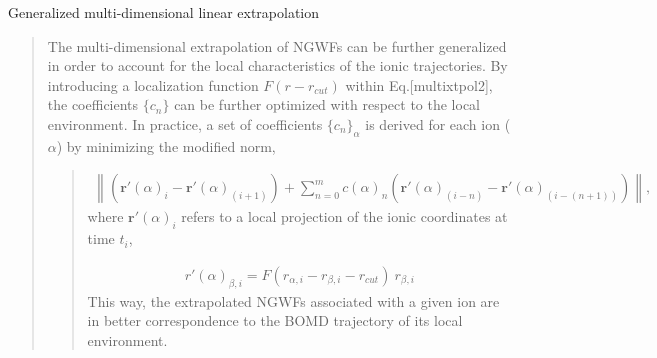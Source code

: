 \documentclass[letterpaper,10pt,english]{sphinxmanual}
\begin{document}
Generalized multi-dimensional linear extrapolation
\begin{quote}

\begin{DUlineblock}{0em}
\item[] The multi-dimensional extrapolation of NGWFs can be further
generalized in order to account for the local characteristics of
the ionic trajectories. By introducing a localization function
\(F(r-r_{cut})\) within Eq.{[}multixtpol2{]}, the coefficients
\(\{c_n\}\) can be further optimized with respect to the local
environment. In practice, a set of coefficients
\(\{c_{n}\}_{\alpha}\) is derived for each ion
(\(\alpha\)) by minimizing the modified norm,
\end{DUlineblock}
\begin{quote}
\label{\detokenize{BOMD:equation-genxtpol1}}\begin{equation}\label{equation:BOMD:genxtpol1}
\begin{split}\left\| \left(\mathbf{r'}(\alpha)_i - \mathbf{r'}(\alpha)_{(i+1)} \right) + \sum_{n=0}^{m} c(\alpha)_n \left(\mathbf{r'}(\alpha)_{(i-n)}  - \mathbf{r'}(\alpha)_{(i-(n+1))} \right) \right\|,\end{split}
\end{equation}
where \(\mathbf{r'}(\alpha)_i\) refers to a local projection
of the ionic coordinates at time \(t_i\),

\label{\detokenize{BOMD:equation-genxtpol2}}\begin{equation}\label{equation:BOMD:genxtpol2}
\begin{split}r'(\alpha)_{\beta,i} = F(r_{\alpha,i}-r_{\beta,i}  -r_{cut}) \ r_{\beta,i}\end{split}
\end{equation}
This way, the extrapolated NGWFs associated with a given ion are
in better correspondence to the BOMD trajectory of its local
environment.
\end{quote}
\end{quote}
\end{document}
